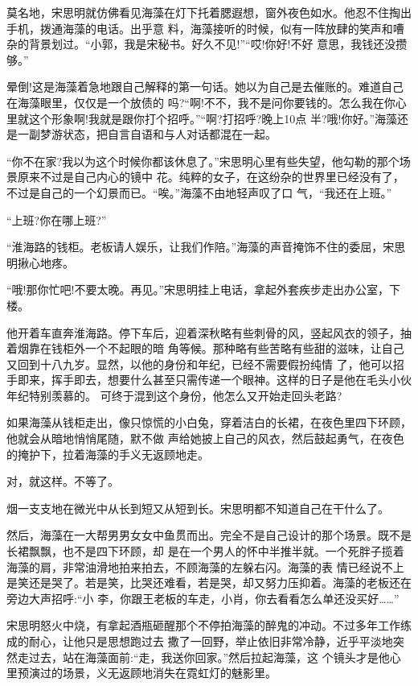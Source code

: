 \documentclass[11pt,a4paper,onecolumn]{article}
\begin{document}
莫名地，宋思明就仿佛看见海藻在灯下托着腮遐想，窗外夜色如水。他忍不住掏出手机，拨通海藻的电话。出乎意
料，海藻接听的时候，似有一阵放肆的笑声和嘈杂的背景划过。``小郭，我是宋秘书。好久不见!''``哎!你好!不好
意思，我钱还没攒够。''

晕倒!这是海藻着急地跟自己解释的第一句话。她以为自己是去催账的。难道自己在海藻眼里，仅仅是一个放债的
吗?``啊!不不，我不是问你要钱的。怎么我在你心里就这个形象啊!我就是跟你打个招呼。''``啊?打招呼?晚上10点
半?哦!你好。''海藻还是一副梦游状态，把自言自语和与人对话都混在一起。

``你不在家?我以为这个时候你都该休息了。''宋思明心里有些失望，他勾勒的那个场景原来不过是自己内心的镜中
花。纯粹的女子，在这纷杂的世界里已经没有了，不过是自己的一个幻景而已。``唉。''海藻不由地轻声叹了口
气，``我还在上班。''

``上班?你在哪上班?''

``淮海路的钱柜。老板请人娱乐，让我们作陪。''海藻的声音掩饰不住的委屈，宋思明揪心地疼。

``哦!那你忙吧!不要太晚。再见。''宋思明挂上电话，拿起外套疾步走出办公室，下楼。

他开着车直奔淮海路。停下车后，迎着深秋略有些刺骨的风，竖起风衣的领子，抽着烟靠在钱柜外一个不起眼的暗
角等候。那种略有些苦略有些甜的滋味，让自己又回到十八九岁。显然，以他的身份和年纪，已经不需要假扮纯情
了，他可以招手即来，挥手即去，想要什么甚至只需传递一个眼神。这样的日子是他在毛头小伙年纪特别羡慕的。
可终于混到这个身份，他怎么又开始走回头老路?

如果海藻从钱柜走出，像只惊慌的小白兔，穿着洁白的长裙，在夜色里四下环顾，他就会从暗地悄悄尾随，默不做
声给她披上自己的风衣，然后鼓起勇气，在夜色的掩护下，拉着海藻的手义无返顾地走。

对，就这样。不等了。

烟一支支地在微光中从长到短又从短到长。宋思明都不知道自己在干什么了。

然后，海藻在一大帮男男女女中鱼贯而出。完全不是自己设计的那个场景。既不是长裙飘飘，也不是四下环顾，却
是在一个男人的怀中半推半就。一个死胖子揽着海藻的肩，非常油滑地拍来拍去，不顾海藻的左躲右闪。海藻的表
情已经说不上是笑还是哭了。若是笑，比哭还难看，若是哭，却又努力压抑着。海藻的老板还在旁边大声招呼:``小
李，你跟王老板的车走，小肖，你去看看怎么单还没买好……''

宋思明怒火中烧，有拿起酒瓶砸醒那个不停拍海藻的醉鬼的冲动。不过多年工作练成的耐心，让他只是思想跑过去
撒了一回野，举止依旧非常冷静，近乎平淡地突然走过去，站在海藻面前:``走，我送你回家。''然后拉起海藻，这
个镜头才是他心里预演过的场景，义无返顾地消失在霓虹灯的魅影里。
\end{document}
